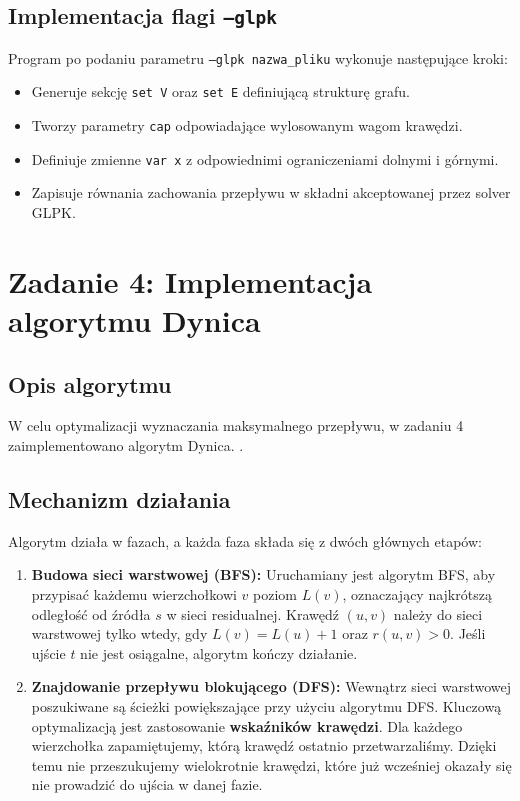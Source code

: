 \documentclass[11pt, a4paper]{article}
\begin{document}
	\subsection{Implementacja flagi \texttt{--glpk}}
	Program po podaniu parametru \texttt{--glpk nazwa\_pliku} wykonuje następujące kroki:
	\begin{itemize}
		\item Generuje sekcję \texttt{set V} oraz \texttt{set E} definiującą strukturę grafu.
		\item Tworzy parametry \texttt{cap} odpowiadające wylosowanym wagom krawędzi.
		\item Definiuje zmienne \texttt{var x} z odpowiednimi ograniczeniami dolnymi i górnymi.
		\item Zapisuje równania zachowania przepływu w składni akceptowanej przez solver GLPK.
	\end{itemize}
	
	\section{Zadanie 4: Implementacja algorytmu Dynica}
	
	\subsection{Opis algorytmu}
	W celu optymalizacji wyznaczania maksymalnego przepływu, w zadaniu 4 zaimplementowano algorytm Dynica. .
	
	\subsection{Mechanizm działania}
	Algorytm działa w fazach, a każda faza składa się z dwóch głównych etapów:
	
	\begin{enumerate}
		\item \textbf{Budowa sieci warstwowej (BFS):}
		Uruchamiany jest algorytm BFS, aby przypisać każdemu wierzchołkowi $v$ poziom $L(v)$, oznaczający najkrótszą odległość od źródła $s$ w sieci residualnej. Krawędź $(u, v)$ należy do sieci warstwowej tylko wtedy, gdy $L(v) = L(u) + 1$ oraz $r(u, v) > 0$. Jeśli ujście $t$ nie jest osiągalne, algorytm kończy działanie.
		
		\item \textbf{Znajdowanie przepływu blokującego (DFS):}
		Wewnątrz sieci warstwowej poszukiwane są ścieżki powiększające przy użyciu algorytmu DFS. Kluczową optymalizacją jest zastosowanie \textbf{wskaźników krawędzi}. Dla każdego wierzchołka zapamiętujemy, którą krawędź ostatnio przetwarzaliśmy. Dzięki temu nie przeszukujemy wielokrotnie krawędzi, które już wcześniej okazały się nie prowadzić do ujścia w danej fazie.
	\end{enumerate}
	
\end{document}
